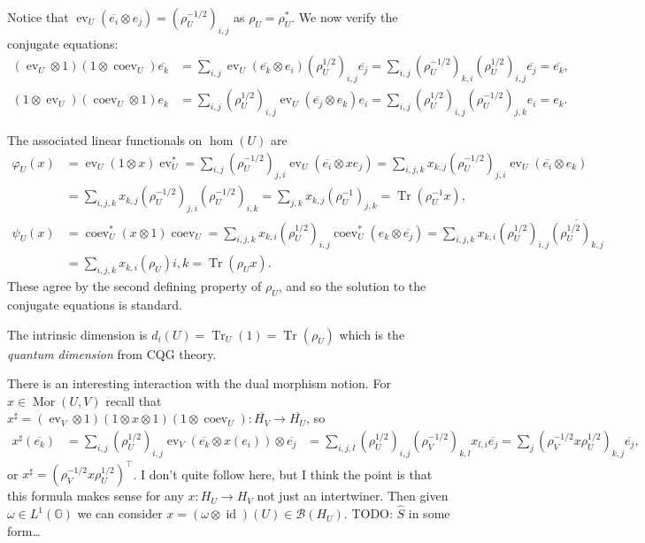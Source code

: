 \documentclass[a4paper,11pt]{article}
\theoremstyle{plain}
\theoremstyle{remark}
\newcommand{\mc}[1]{\mathcal{#1}}
\newcommand{\id}{\operatorname{id}}
\newcommand{\hh}{\widehat}
\newcommand{\G}{\mathbb{G}}
\newcommand{\ev}{\operatorname{ev}}
\newcommand{\coev}{\operatorname{coev}}
\newcommand{\tr}{\operatorname{Tr}}
\newcommand{\mor}{\operatorname{Mor}}
\begin{document}
Notice that $\ev_U(\overline{e_i} \otimes e_j) = (\rho_U^{-1/2})_{i,j}$ as $\rho_U = \rho_U^*$.
We now verify the conjugate equations:
\begin{align*}
(\ev_U \otimes 1)(1\otimes\coev_U)\overline{e_k}
&= \sum_{i,j} \ev_U(\overline{e_k}\otimes e_i) (\rho_U^{1/2})_{i,j} \overline{e_j}
= \sum_{i,j} (\rho_U^{-1/2})_{k,i}(\rho_U^{1/2})_{i,j} \overline{e_j}
= \overline{e_k}, \\
(1\otimes\ev_U)(\coev_U\otimes 1)e_k
&= \sum_{i,j} (\rho_U^{1/2})_{i,j} \ev_U(\overline{e_j}\otimes e_k) e_i
= \sum_{i,j} (\rho_U^{1/2})_{i,j} (\rho_U^{-1/2})_{j,k} e_i
= e_k.
\end{align*}

The associated linear functionals on $\hom(U)$ are
\begin{align*}
\varphi_U(x) &= \ev_U(1\otimes x)\ev_U^* = \sum_{i,j} (\rho_U^{-1/2})_{j,i}\ev_U(\overline{e_i}\otimes xe_j)
= \sum_{i,j,k} x_{k,j} (\rho_U^{-1/2})_{j,i}\ev_U(\overline{e_i}\otimes e_k) \\
&= \sum_{i,j,k} x_{k,j} (\rho_U^{-1/2})_{j,i} (\rho_U^{-1/2})_{i,k}
= \sum_{j,k} x_{k,j} (\rho_U^{-1})_{j,k}
= \tr(\rho_U^{-1}x), \\
\psi_U(x) &= \coev_U^*(x\otimes 1)\coev_U = \sum_{i,j,k} x_{k,i} (\rho_U^{1/2})_{i,j}\coev_U^*(e_k \otimes \overline{e_j})
= \sum_{i,j,k} x_{k,i} (\rho_U^{1/2})_{i,j} \overline{ (\rho_U^{1/2})_{k,j} } \\
&= \sum_{i,j,k} x_{k,i} (\rho_U){i,k}
= \tr(\rho_U x).
\end{align*}
These agree by the second defining property of $\rho_U$, and so the solution to the conjugate equations is standard.

The intrinsic dimension is $d_i(U) = \tr_U(1) = \tr(\rho_U)$ which is the \emph{quantum dimension} from CQG theory.

There is an interesting interaction with the dual morphism notion.  For $x\in\mor(U,V)$ recall that $x^\sharp = (\ev_V\otimes 1)(1\otimes x\otimes 1)(1\otimes\coev_U) \colon \overline{H_V} \to \overline{H_U}$, so
\begin{align*}
x^\sharp (\overline{e_k})
&= \sum_{i,j} (\rho_U^{1/2})_{i,j} \ev_V(\overline{e_k} \otimes x(e_i)) \otimes \overline{e_j}
&= \sum_{i,j,l} (\rho_U^{1/2})_{i,j} (\rho_V^{-1/2})_{k,l} x_{l,i} \overline{e_j}
= \sum_j (\rho_V^{-1/2} x \rho_U^{1/2})_{k,j} \overline{e_j},
\end{align*}
or $x^\sharp = (\rho_V^{-1/2} x \rho_U^{1/2})^\top$.  I don't quite follow \cite[Remark~2.2.23]{NT_CQGsBook} here, but I think the point is that this formula makes sense for any $x\colon H_U \to H_V$ not just an intertwiner.  Then given $\omega\in L^1(\G)$ we can consider $x = (\omega\otimes\id)(U) \in \mc B(H_U)$.  TODO: $\hh S$ in some form\ldots
\end{document}
